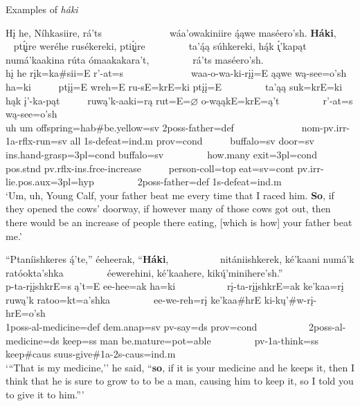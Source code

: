 \begin{exe}
    \item\label{Ch6ExamplesHaki} Examples of \textit{háki}

    \begin{xlist}
        \item\label{Ch6ExamplesHakiA} \glll Hį he, Níhkasiire, rá'ts ~ ~ ~ ~ ~ ~ ~ ~ wáa'owakiniire ą́ąwe maséero'sh. \textbf{Háki}, ~ ~ ~  pt\'{ı̨}įre weréhe rusékereki, pti\'{ı̨}įre ~ ~ ~ ~ ~ ta'ą́ą súhkereki, hą́k \'{ı̨}'kapąt  ~ ~ ~ numá'kaakina rúta ómaakakara't, ~ ~ ~ ~ ~ rá'ts maséero'sh.\\
        hį he rįk=ka\#sii=E r'-at=s ~ ~ ~ ~ ~ ~ ~ ~ waa-o-wa-ki-rįį=E ąąwe wą-see=o'sh ha=ki ~ ~ ~ ptįį=E wreh=E ru-sE=krE=ki ptįį=E ~ ~ ~ ~ ~ ta'ąą suk=krE=ki hąk į'-ka-pąt ~ ~ ~ ruwą'k-aaki=rą rut=E=$\varnothing$ o-wąąkE=krE=ą't ~ ~ ~ ~ ~ r'-at=s wą-see=o'sh\\
        \textnormal{uh} \textnormal{um} \textnormal{offspring}=hab\#\textnormal{be.yellow}=sv 2poss-\textnormal{father}=def ~ ~ ~ ~ ~ ~ ~ ~ nom-pv.irr-1a-rflx-\textnormal{run}=sv \textnormal{all} 1s-\textnormal{defeat}=ind.m prov=cond ~ ~ ~  \textnormal{buffalo}=sv \textnormal{door}=sv ins.hand-\textnormal{grasp}=3pl=cond \textnormal{buffalo}=sv ~ ~ ~ ~ ~ \textnormal{how.many} \textnormal{exit}=3pl=cond pos.stnd pv.rflx-ins.frce-\textnormal{increase} ~ ~ ~ \textnormal{person}-coll=top \textnormal{eat}=sv=cont pv.irr-\textnormal{lie}.pos.aux=3pl=hyp ~ ~ ~ ~ ~ 2poss-\textnormal{father}=def 1s-\textnormal{defeat}=ind.m\\
        \glt `Um, uh, Young Calf, your father beat me every time that I raced him. \textbf{So}, if they opened the cows' doorway, if however many of those cows got out, then there would be an increase of people there eating, [which is how] your father beat me.' \citep[124]{hollow1973a}

        \item\label{Ch6ExamplesHakiB} \glll ``Ptaníishkeres ą́'te,'' éeheerak, ``\textbf{Háki}, ~ ~ ~ ~ ~ ~ nitániishkerek, ké'kaani numá'k ratóokta'shka ~ ~ ~ ~ ~ éewerehini, ké’kaahere, kikų́'minihere'sh.''\\
        p-ta-rįįshkrE=s ą't=E ee-hee=ak ha=ki ~ ~ ~ ~ ~ ~ rį-ta-rįįshkrE=ak ke'kaa=rį ruwą'k ratoo=kt=a'shka ~ ~ ~ ~ ~ ee-we-reh=rį ke'kaa\#hrE ki-kų'\#w-rį-hrE=o'sh\\
        1poss-al-\textnormal{medicine}=def dem.anap=sv pv-\textnormal{say}=ds prov=cond ~ ~ ~ ~ ~ ~ 2poss-al-\textnormal{medicine}=ds \textnormal{keep}=ss \textnormal{man} \textnormal{be.mature}=pot=able ~ ~ ~ ~ ~ pv-1a-\textnormal{think}=ss \textnormal{keep}\#caus suus-\textnormal{give}\#1a-2s-caus=ind.m\\
        \glt `{``}That is my medicine,'' he said, ``\textbf{so}, if it is your medicine and he keeps it, then I think that he is sure to grow to to be a man, causing him to keep it, so I told you to give it to him.{''}' \citep[59]{hollow1973a}
        
    \end{xlist}
\end{exe}

